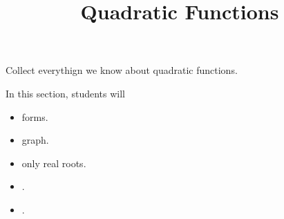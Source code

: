 \documentclass{ximera}
\title{Quadratic Functions}
\begin{document}
\begin{abstract}
\end{abstract}
\maketitle






Collect everythign we know about quadratic functions.






















\begin{sectionOutcomes}
In this section, students will 

\begin{itemize}
\item forms.
\item graph.
\item only real roots.
\item .
\item .
\end{itemize}
\end{sectionOutcomes}
\end{document}
